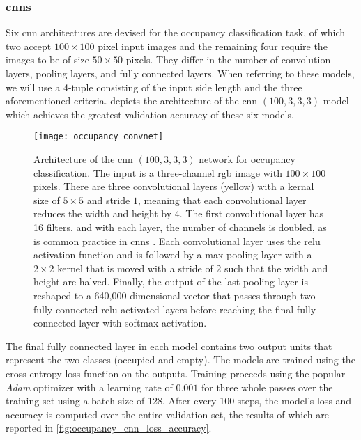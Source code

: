\documentclass[../main.tex]{subfiles}
\begin{document}
\subsubsection{\Glspl{cnn}}
Six \gls{cnn} architectures are devised for the occupancy classification task, of which two accept $100\times 100$ pixel input images and the remaining four require the images to be of size $50\times 50$ pixels.
They differ in the number of convolution layers, pooling layers, and fully connected layers.
When referring to these models, we will use a 4-tuple consisting of the input side length and the three aforementioned criteria.
 depicts the architecture of the \gls{cnn} $(100, 3, 3, 3)$ model which achieves the greatest validation accuracy of these six models.
\begin{figure}
    \centering
    \texttt{[image: occupancy\_convnet]}
    \caption[Architecture of the CNN $(100,3,3,3)$ network for occupancy classification.]{
        Architecture of the \gls{cnn} $(100,3,3,3)$ network for occupancy classification.
        The input is a three-channel \gls{rgb} image with $100\times 100$ pixels.
        There are three convolutional layers (yellow) with a kernal size of $5 \times 5$ and stride $1$, meaning that each convolutional layer reduces the width and height by $4$.
        The first convolutional layer has 16 filters, and with each layer, the number of channels is doubled, as is common practice in \glspl{cnn} \cite{simonyan2015}.
        Each convolutional layer uses the \gls{relu} activation function and is followed by a max pooling layer with a $2\times 2$ kernel that is moved with a stride of $2$ such that the width and height are halved.
        Finally, the output of the last pooling layer is reshaped to a 640,000-dimensional vector that passes through two fully connected \gls{relu}-activated layers before reaching the final fully connected layer with softmax activation.
    }
    \label{fig:occupancy_convnet}
\end{figure}
The final fully connected layer in each model contains two output units that represent the two classes (occupied and empty).
The models are trained using the cross-entropy loss function on the outputs.
Training proceeds using the popular \emph{Adam} optimizer \cite{kingma2017} with a learning rate of $0.001$ for three whole passes over the training set using a batch size of 128.
After every 100 steps, the model's loss and accuracy is computed over the entire validation set, the results of which are reported in \cref{fig:occupancy_cnn_loss_accuracy}.
\end{document}
